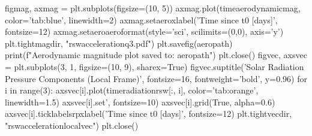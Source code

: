 \markdownRendererHeadingOne{-------------------------------------------------------------------------}\markdownRendererInterblockSeparator
{}figmag, axmag = plt.subplots(figsize=(10, 5)) axmag.plot(timeaerodynamicmag, color='tab:blue', linewidth=2) axmag.setaeroxlabel('Time since t0 [days]', fontsize=12) axmag.setaeroaeroformat(style='sci', scilimits=(0,0), axis='y') plt.tightmagdir, "rswaccelerationq3.pdf") plt.savefig(aeropath) print(f"Aerodynamic magnitude plot saved to: {aeropath}") plt.close()\markdownRendererInterblockSeparator
{}
\markdownRendererSectionEnd \markdownRendererSectionBegin
\markdownRendererHeadingOne{-------------------------------------------------------------------------}\markdownRendererInterblockSeparator
{}
\markdownRendererSectionEnd \markdownRendererSectionBegin
{}\markdownRendererInterblockSeparator
{}
\markdownRendererSectionEnd \markdownRendererSectionBegin
\markdownRendererHeadingOne{-------------------------------------------------------------------------}\markdownRendererInterblockSeparator
{}figvec, axsvec = plt.subplots(3, 1, figsize=(10, 9), sharex=True) figvec.suptitle('Solar Radiation Pressure Components (Local Frame)', fontsize=16, fontweight='bold', y=0.96) for i in range(3): axsvec[i].plot(timeradiationrsw[:, i], color='tab:orange', linewidth=1.5) axsvec[i].set\n[m/s²]', fontsize=10) axsvec[i].grid(True, alpha=0.6) axsvec[i].ticklabelsrpxlabel('Time since t0 [days]', fontsize=12) plt.tightvecdir, "rswaccelerationlocalvec") plt.close()\markdownRendererInterblockSeparator

